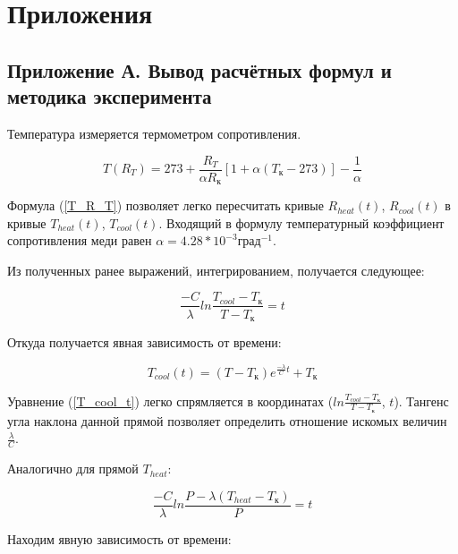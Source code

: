 \chapter{Приложения}
\label{ch:appendix}

    	
\section{Приложение А. Вывод расчётных формул и методика эксперимента}

    Температура измеряется термометром сопротивления. 

    \begin{equation}
        T(R_T) = 273 + \frac{R_T}{\alpha R_{\text{к}}} \left[ 1 + \alpha (T_{\text{к}} - 273) \right] - \frac{1}{\alpha}
        \label{T_R_T}
    \end{equation}

    Формула (\ref{T_R_T}) позволяет легко пересчитать кривые $R_{heat}(t)$, $R_{cool}(t)$ в кривые $T_{heat}(t)$, $T_{cool}(t)$. Входящий в формулу температурный коэффициент сопротивления меди равен $\alpha = 4.28*10^{-3} {\text{град}}^{-1}$.

    Из полученных ранее выражений, интегрированием, получается следующее:
    
    \begin{equation}
        \frac{-C}{\lambda} ln \frac{T_{cool} - T_{\text{к}}}{T - T_{\text{к}}} = t
        \label{eq:diff_integral}
    \end{equation}

    Откуда получается явная зависимость от времени:

    \begin{equation}
        T_{cool}(t) = (T - T_{\text{к}}) e^{\frac{- \lambda}{C} t} + T_{\text{к}}
        \label{T_cool_t}
    \end{equation}

    Уравнение (\ref{T_cool_t}) легко спрямляется в координатах ($ln \frac{T_{cool} - T_{\text{к}}}{T - T_{\text{к}}}$, $t$). Тангенс угла наклона данной прямой позволяет определить отношение искомых величин $\frac{\lambda}{C}$.

    Аналогично для прямой $T_{heat}$:

    \begin{equation}
        \frac{-C}{\lambda} ln \frac{P - \lambda (T_{heat} - T_{\text{к}})}{P} = t
        \label{eq:diff_integral2}
    \end{equation}

    Находим явную зависимость от времени:

